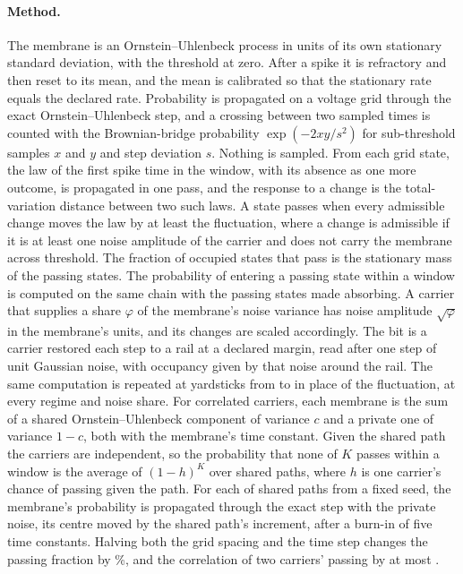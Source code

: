 \documentclass[12pt]{article}
\begin{document}
\paragraph{Method.} The membrane is an Ornstein--Uhlenbeck process in units of its own stationary
standard deviation, with the threshold at zero. After a spike it is refractory
and then reset to its mean, and the mean is calibrated so that the stationary
rate equals the declared rate. Probability is propagated on a voltage grid
through the exact Ornstein--Uhlenbeck step, and a crossing between two sampled
times is counted with the Brownian-bridge probability
$\exp(-2xy/s^2)$ for sub-threshold samples $x$ and $y$ and step deviation $s$.
Nothing is sampled. From each grid state, the law of the first spike time in
the window, with its absence as one more outcome, is propagated in one pass, and
the response to a change is the total-variation distance between two such laws.
A state passes when every admissible change moves the law by at least the
fluctuation, where a change is admissible if it is at least one noise amplitude
of the carrier and does not carry the membrane across threshold. The fraction of
occupied states that pass is the stationary mass of the passing states. The
probability of entering a passing state within a window is computed on the same
chain with the passing states made absorbing. A carrier that supplies a share
$\varphi$ of the membrane's noise variance has noise amplitude $\sqrt{\varphi}$
in the membrane's units, and its changes are scaled accordingly. The bit is a
carrier restored each step to a rail at a declared margin, read after one step of
unit Gaussian noise, with occupancy given by that noise around the rail. The
same computation is repeated at yardsticks from \uYardLow{} to \uYardHigh{} in
place of the fluctuation, at every regime and noise share. For correlated
carriers, each membrane is the sum of a shared Ornstein--Uhlenbeck component of
variance $c$ and a private one of variance $1-c$, both with the membrane's time
constant. Given the shared path the carriers are independent, so the
probability that none of $K$ passes within a window is the average of
$(1-h)^K$ over shared paths, where $h$ is one carrier's chance of passing given
the path. For each of \uCorPaths{} shared paths from a fixed seed, the
membrane's probability is propagated through the exact step with the private
noise, its centre moved by the shared path's increment, after a burn-in of five
time constants. Halving
both the grid spacing and the time step changes the passing fraction by
\uOccResolutionPercent\%, and the correlation of two carriers' passing by at
most \uCorResolutionRho{}.
\end{document}
